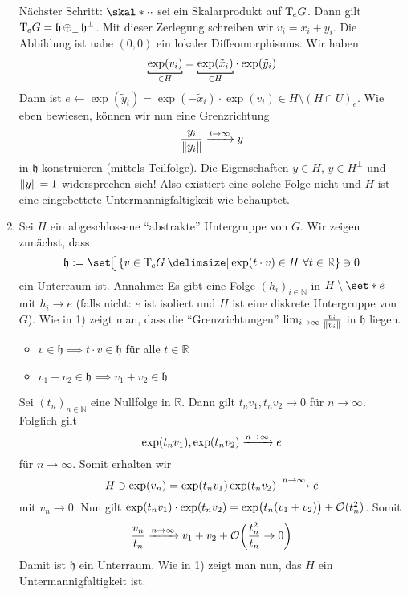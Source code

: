 \begin{beweis}
\begin{enumerate}[1)]
		Nächster Schritt: $\skal*{\cdot }{\cdot }$ sei ein Skalarprodukt auf $\Tmap_e G$.
		Dann gilt $\Tmap_e G = \mathfrak{h} \mathop{\oplus_{\bot}} \mathfrak{h}^{\bot}$.
		Mit dieser Zerlegung schreiben wir $v_i =x_i + y_i$.
		Die Abbildung 
		ist nahe $(0,0)$ ein lokaler Diffeomorphismus.
		Wir haben
		\[
			\Underbracket{\exp(v_i)}{\in H} = \Underbracket{\exp(\tilde{x}_i)}{\in H} \cdot \exp(\tilde{y}_i)
		\]
		Dann ist $e \longleftarrow  \exp(\tilde{y}_i) = \exp(- \tilde{x}_i) \cdot \exp(v_i) \in H \setminus (H \cap U)_e$.
		Wie eben bewiesen, können wir nun eine Grenzrichtung 
		\[
			\frac{y_i}{\norm*{y_i}} \grenzw{i \to \infty}  y
		\]
		in $\mathfrak{h}$ konstruieren (mittels Teilfolge).
		Die Eigenschaften $y \in H$, $y \in H^\bot$ und $\norm*{y}=1$ widersprechen sich!
		Also existiert eine solche Folge nicht und $H$ ist eine eingebettete Untermannigfaltigkeit wie behauptet.
		\item Sei $H$ ein abgeschlossene \enquote{abstrakte} Untergruppe von $G$.
		Wir zeigen zunächst, dass 
		\[
			\mathfrak{h} := \set[\big]{v \in \Tmap_e G \given \exp(t \cdot v) \in H \,\,\forall t \in \mathbb{R}} \ni 0
		\]
		ein Unterraum ist.
		Annahme: Es gibt eine Folge $(h_i)_{i \in \mathbb{N}}$ in $H \setminus \set*{e}$ mit $h_i \to e$ (falls nicht: $e$ ist isoliert und $H$ ist eine diskrete Untergruppe von $G$).
		Wie in 1) zeigt man, dass die \enquote{Grenzrichtungen} $\lim_{i \to \infty} \frac{v_i}{\norm*{v_i}}$ in $\mathfrak{h}$ liegen.
		\begin{itemize}[itemsep=0pt]
			\item $v \in \mathfrak{h} \implies t \cdot v \in \mathfrak{h}$ für alle $t \in \mathbb{R}$
			\item $v_1 + v_2 \in \mathfrak{h} \implies v_1 + v_2 \in \mathfrak{h}$
		\end{itemize}
		Sei $(t_n)_{n \in \mathbb{N}}$ eine Nullfolge in $\mathbb{R}$.
		Dann gilt $t_n v_1, t_n v_2 \to 0$ für $n \to \infty$.
		Folglich gilt 
		\[
			\exp(t_n v_1), \exp(t_n v_2) \grenzw{n \to \infty} e 
		\]
		für $n \to \infty$. Somit erhalten wir
		\[
			H \ni \exp(v_n) = \exp \enbrace*{t_n v_1} \exp(t_n v_2) \grenzw{n \to \infty} e
		\]
		mit $v_n \to 0$.
		Nun gilt $\exp(t_n v_1) \cdot \exp(t_n v_2) = \exp \enbrace[\big]{t_n(v_1 + v_2)} + \mathcal{O}(t_n^2)$.
		Somit
		\[
			\frac{v_n}{t_n} \grenzw{n \to \infty} v_1 +v_2 + \mathcal{O} \enbrace*{\frac{t_n^2}{t_n} \to 0 } 
		\]
		Damit ist $\mathfrak{h}$ ein Unterraum.
		Wie in 1) zeigt man nun, das $H$ ein Untermannigfaltigkeit ist.\qedhere
	\end{enumerate}
\end{beweis}

